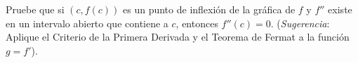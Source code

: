 \item Pruebe que si $(c, f(c))$ es un punto de inflexión de la gráfica de $f$ y $f''$ existe en un intervalo abierto que contiene a $c$, entonces $f''(c) = 0$. (\textit{Sugerencia}: Aplique el Criterio de la Primera Derivada y el Teorema de Fermat a la función $g = f'$).

